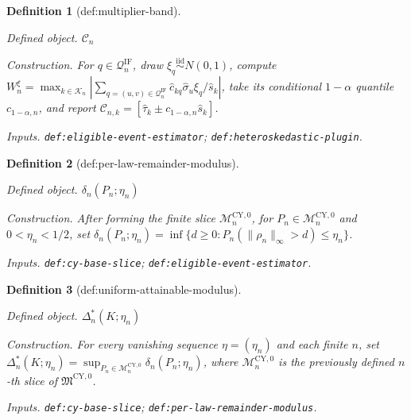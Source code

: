 \documentclass{article}
\newtheorem{definition}{Definition}
\begin{document}
\begin{definition}[def:multiplier-band]\label{def:multiplier-band}
\par\smallskip\noindent\emph{Defined object.} \(\mathcal C_n\)
\par\smallskip\noindent\emph{Construction.} For \(q\in\mathcal Q_n^{\mathrm{IF}}\), draw \(\xi_q\stackrel{\mathrm{iid}}{\sim}N(0,1)\), compute \(W_n^\xi=\max_{k\in\mathcal K_n}|\sum_{q=(u,v)\in\mathcal Q_n^{\mathrm{IF}}}\widehat c_{kq}\widehat\sigma_u\xi_q/\widehat s_k|\), take its conditional \(1-\alpha\) quantile \(c_{1-\alpha,n}\), and report \(\mathcal C_{n,k}=[\widehat\tau_k\pm c_{1-\alpha,n}\widehat s_k]\).
\par\smallskip\noindent\emph{Inputs.} \texttt{def:\allowbreak{}eligible-\allowbreak{}event-\allowbreak{}estimator}; \texttt{def:\allowbreak{}heteroskedastic-\allowbreak{}plugin}.
\end{definition}

\begin{definition}[def:per-law-remainder-modulus]\label{def:per-law-remainder-modulus}
\par\smallskip\noindent\emph{Defined object.} \(\delta_n(P_n;\eta_n)\)
\par\smallskip\noindent\emph{Construction.} After forming the finite slice \(\mathcal M_n^{\mathrm{CY},0}\), for \(P_n\in\mathcal M_n^{\mathrm{CY},0}\) and \(0<\eta_n<1/2\), set \(\delta_n(P_n;\eta_n)=\inf\{d\ge0:P_n(\|\rho_n\|_\infty>d)\le\eta_n\}\).
\par\smallskip\noindent\emph{Inputs.} \texttt{def:\allowbreak{}cy-\allowbreak{}base-\allowbreak{}slice}; \texttt{def:\allowbreak{}eligible-\allowbreak{}event-\allowbreak{}estimator}.
\end{definition}

\begin{definition}[def:uniform-attainable-modulus]\label{def:uniform-attainable-modulus}
\par\smallskip\noindent\emph{Defined object.} \(\Delta_n^*(K;\eta_n)\)
\par\smallskip\noindent\emph{Construction.} For every vanishing sequence \(\eta=(\eta_n)\) and each finite \(n\), set \(\Delta_n^*(K;\eta_n)=\sup_{P_n\in\mathcal M_n^{\mathrm{CY},0}}\delta_n(P_n;\eta_n)\), where \(\mathcal M_n^{\mathrm{CY},0}\) is the previously defined \(n\)-th slice of \(\mathfrak M^{\mathrm{CY},0}\).
\par\smallskip\noindent\emph{Inputs.} \texttt{def:\allowbreak{}cy-\allowbreak{}base-\allowbreak{}slice}; \texttt{def:\allowbreak{}per-\allowbreak{}law-\allowbreak{}remainder-\allowbreak{}modulus}.
\end{definition}
\end{document}
